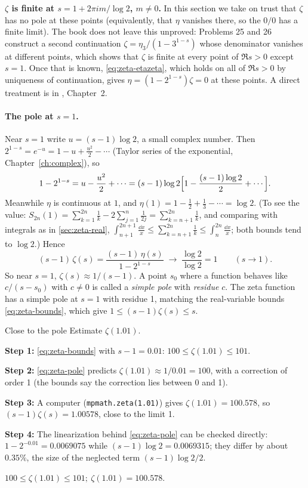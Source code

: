 \begin{beyond}
\textbf{$\zeta$ is finite at $s=1+2\pi i m/\log2$, $m\ne0$.} In this section we take on trust that $\zeta$ has no pole at these points (equivalently, that $\eta$ vanishes there, so the $0/0$ has a finite limit). The book does not leave this unproved: Problems 25 and 26 construct a second continuation $\zeta=\eta_3/(1-3^{1-s})$ whose denominator vanishes at different points, which shows that $\zeta$ is finite at every point of $\Re s>0$ except $s=1$. Once that is known, \cref{eq:zeta-etazeta}, which holds on all of $\Re s>0$ by uniqueness of continuation, gives $\eta=(1-2^{1-s})\zeta=0$ at these points. A direct treatment is in \cite{titchmarsh}, Chapter~2.
\end{beyond}

\paragraph{The pole at $s=1$.} Near $s=1$ write $u=(s-1)\log2$, a small complex number. Then $2^{1-s}=e^{-u}=1-u+\tfrac{u^2}{2}-\cdots$ (Taylor series of the exponential, Chapter~\ref{ch:complex}), so
\[
1-2^{1-s}=u-\frac{u^2}{2}+\cdots=(s-1)\log2\Bigl[1-\frac{(s-1)\log 2}{2}+\cdots\Bigr].
\]
Meanwhile $\eta$ is continuous at $1$, and $\eta(1)=1-\tfrac12+\tfrac13-\cdots=\log2$. (To see the value: $S_{2n}(1)=\sum_{k=1}^{2n}\frac1k-2\sum_{j=1}^{n}\frac{1}{2j}=\sum_{k=n+1}^{2n}\frac1k$, and comparing with integrals as in \cref{sec:zeta-real}, $\int_{n+1}^{2n+1}\frac{\dd x}{x}\le\sum_{k=n+1}^{2n}\frac1k\le\int_n^{2n}\frac{\dd x}{x}$; both bounds tend to $\log2$.) Hence
\begin{equation}
(s-1)\,\zeta(s)=\frac{(s-1)\,\eta(s)}{1-2^{1-s}}\;\longrightarrow\;\frac{\log 2}{\log2}=1\qquad(s\to1).
\label{eq:zeta-pole}
\end{equation}
So near $s=1$, $\zeta(s)\approx1/(s-1)$. A point $s_0$ where a function behaves like $c/(s-s_0)$ with $c\ne0$ is called a \emph{simple pole} with \emph{residue} $c$. The zeta function has a simple pole at $s=1$ with residue 1, matching the real-variable bounds \cref{eq:zeta-bounds}, which give $1\le(s-1)\zeta(s)\le s$.

\begin{sample}{Close to the pole}
Estimate $\zeta(1.01)$.

\textbf{Step 1:} \cref{eq:zeta-bounds} with $s-1=0.01$: $100\le\zeta(1.01)\le101$.

\textbf{Step 2:} \cref{eq:zeta-pole} predicts $\zeta(1.01)\approx1/0.01=100$, with a correction of order 1 (the bounds say the correction lies between 0 and 1).

\textbf{Step 3:} A computer (\texttt{mpmath.zeta(1.01)}) gives $\zeta(1.01)=100.578$, so $(s-1)\zeta(s)=1.00578$, close to the limit 1.

\textbf{Step 4:} The linearization behind \cref{eq:zeta-pole} can be checked directly: $1-2^{-0.01}=0.0069075$ while $(s-1)\log 2=0.0069315$; they differ by about $0.35\%$, the size of the neglected term $(s-1)\log2/2$.

$\boxed{100\le\zeta(1.01)\le101;\ \zeta(1.01)=100.578.}$
\end{sample}


